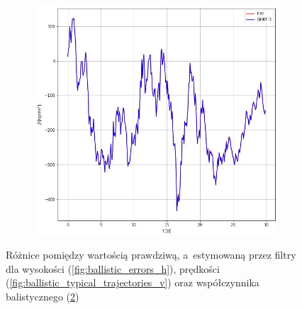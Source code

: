 \begin{figure}
\begin{subfigure}[b]{0.4\linewidth}
		\caption{}
		\label{fig:ballistic_errors_v}
	\end{subfigure}
	\begin{subfigure}[b]{0.4\linewidth}
	\includegraphics[width=\linewidth]{ballistic_tracking_b_errors.jpg}
	\caption{}
	\label{fig:ballistic_errors_b}
	\end{subfigure}
	\caption{Różnice pomiędzy wartością prawdziwą, a~estymowaną przez filtry dla wysokości (\ref{fig:ballistic_errors_h}), prędkości (\ref{fig:ballistic_typical_trajectories_v}) oraz współczynnika balistycznego (\ref{fig:ballistic_errors_b})}
	\label{fig:ballistic_errors}
\end{figure}
